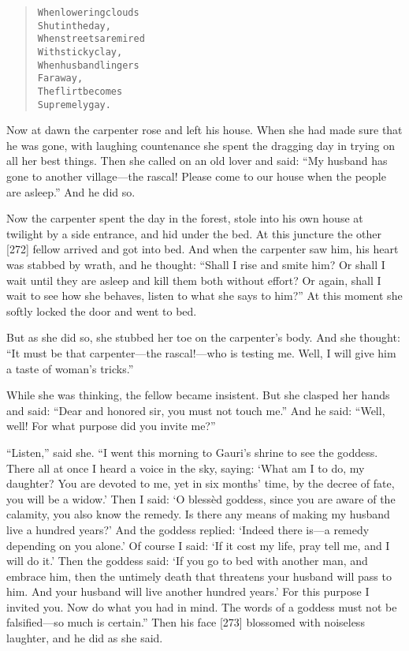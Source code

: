 \documentclass[article, twoside, 14pt]{memoir}
\renewenvironment{verbatim}{%
\begin{quote}%
\vskip -10pt%
\begin{alltt}\normalfont\large}{\end{alltt}%
\end{quote}%
\vskip -10pt
} %
\begin{document}
\begin{verbatim}
When lowering clouds
    Shut in the day,
When streets are mired
    With sticky clay,
When husband lingers
    Far away,
The flirt becomes
    Supremely gay.
\end{verbatim}
Now at dawn the carpenter rose and left his house. When she had
made sure that he was gone, with laughing countenance she spent the
dragging day in trying on all her best things. Then she called on
an old lover and said:
``My husband has gone to another village---the rascal! Please come to our house when the people are asleep.''
And he did so.

Now the carpenter spent the day in the forest, stole into his own
house at twilight by a side entrance, and hid under the bed. At
this juncture the other [272] fellow arrived and got into bed. And
when the carpenter saw him, his heart was stabbed by wrath, and he
thought:
``Shall I rise and smite him? Or shall I wait until they are asleep and kill them both without effort? Or again, shall I wait to see how she behaves, listen to what she says to him?''
At this moment she softly locked the door and went to bed.

But as she did so, she stubbed her toe on the carpenter's body. And
she thought:
``It must be that carpenter---the rascal!---who is testing me. Well, I will give him a taste of woman's tricks.''

While she was thinking, the fellow became insistent. But she
clasped her hands and said:
``Dear and honored sir, you must not touch me.'' And he said:
``Well, well! For what purpose did you invite me?''

``Listen,'' said she.
``I went this morning to Gauri's shrine to see the goddess. There all at once I heard a voice in the sky, saying: `What am I to do, my daughter? You are devoted to me, yet in six months' time, by the decree of fate, you will be a widow.' Then I said: `O blessèd goddess, since you are aware of the calamity, you also know the remedy. Is there any means of making my husband live a hundred years?' And the goddess replied: `Indeed there is---a remedy depending on you alone.' Of course I said: `If it cost my life, pray tell me, and I will do it.' Then the goddess said: `If you go to bed with another man, and embrace him, then the untimely death that threatens your husband will pass to him. And your husband will live another hundred years.' For this purpose I invited you. Now do what you had in mind. The words of a goddess must not be falsified---so much is certain.''
Then his face [273] blossomed with noiseless laughter, and he did
as she said.
\end{document}
